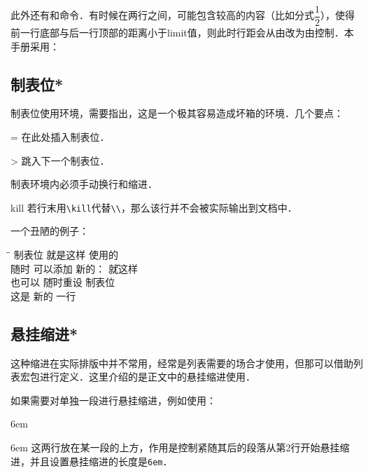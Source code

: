 此外还有和命令．有时候在两行之间，可能包含较高的内容（比如分式$\dfrac{1}{2}$），使得前一行底部与后一行顶部的距离小于limit值，则此时行距会从由改为由控制．本手册采用：
\begin{latex}
\setlength{\lineskiplimit}{3pt}
\setlength{\lineskip}{3pt}
\end{latex}

\subsection{制表位*}
制表位使用环境，需要指出，这是一个极其容易造成坏箱的环境．几个要点：
\begin{para}
\item[\char92{}=] 在此处插入制表位．
\item[\char92{}>] 跳入下一个制表位．
\item[\char92{}\char92{}] 制表环境内必须手动换行和缩进．
\item[\char92{}kill] 若行末用\verb|\kill|代替\verb|\\|，那么该行并不会被实际输出到文档中．
\end{para}

一个丑陋的例子：
\begin{codeshow}
\begin{tabbing}
\hspace{4em}\=\hspace{8em}\=\kill
制表位 \> 就是这样 \> 使用的 \\
随时 \> 可以添加 \> 新的： \= 就这样 \\
也可以 \= 随时重设 \= 制表位 \\
这是 \> 新的 \> 一行
\end{tabbing}
\end{codeshow}

\subsection{悬挂缩进*}
这种缩进在实际排版中并不常用，经常是列表需要的场合才使用，但那可以借助列表宏包进行定义．这里介绍的是正文中的悬挂缩进使用．

如果需要对单独一段进行悬挂缩进，例如使用：
\begin{latex}
\hangindent 6em
\end{latex}

\hangindent 6em
这两行放在某一段的上方，作用是控制紧随其后的段落从第2行开始悬挂缩进，并且设置悬挂缩进的长度是\texttt{6em}．

